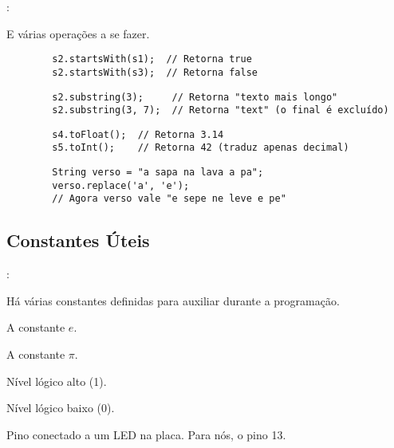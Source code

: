 \begin{frame}[fragile]{\insertsection: \insertsubsection}

	E várias operações a se fazer.

	\begin{verbatim}
		s2.startsWith(s1);  // Retorna true
		s2.startsWith(s3);  // Retorna false
	\end{verbatim}

	\begin{verbatim}
		s2.substring(3);     // Retorna "texto mais longo"
		s2.substring(3, 7);  // Retorna "text" (o final é excluído)
	\end{verbatim}

	\begin{verbatim}
		s4.toFloat();  // Retorna 3.14
		s5.toInt();    // Retorna 42 (traduz apenas decimal)
	\end{verbatim}

	\begin{verbatim}
		String verso = "a sapa na lava a pa";
		verso.replace('a', 'e');
		// Agora verso vale "e sepe ne leve e pe"
	\end{verbatim}

\end{frame}


\subsection{Constantes Úteis}


\begin{frame}{\insertsection: \insertsubsection}

	Há várias constantes definidas para auxiliar durante a programação.
	\begin{description} %
		\item[\texttt{EULER}] A constante $e$.
		\item[\texttt{PI}] A constante $\pi$.
		\item[\texttt{HIGH}] Nível lógico alto (1).
		\item[\texttt{LOW}] Nível lógico baixo (0).
		\item[\texttt{LED\_BUILTIN}] Pino conectado a um LED na placa. Para nós, o pino 13.
		\item[\texttt{\textellipsis}]
	\end{description}

\end{frame}


